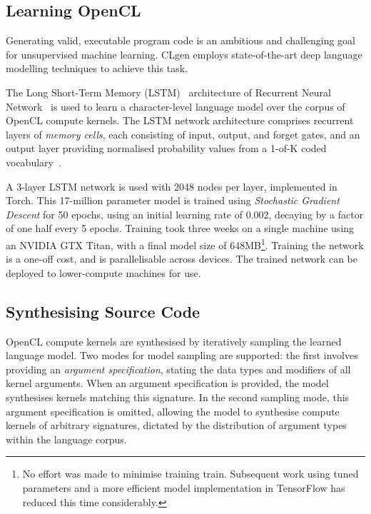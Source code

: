 \subsection{Learning OpenCL}
\label{sec:learning-opencl}

Generating valid, executable program code is an ambitious and challenging goal for unsupervised machine learning. CLgen employs state-of-the-art deep language modelling techniques to achieve this task.

The Long Short-Term Memory (LSTM)~\cite{Hochreiter1997} architecture of Recurrent Neural Network~\cite{Sundermeyer2012,Mikolov2015} is used to learn a character-level language model over the corpus of OpenCL compute kernels. The LSTM network architecture comprises recurrent layers of \emph{memory cells}, each consisting of input, output, and forget gates, and an output layer providing normalised probability values from a 1-of-K coded vocabulary~\cite{Graves2005}.

A 3-layer LSTM network is used with 2048 nodes per layer, implemented in Torch. This 17-million parameter model is trained using \textit{Stochastic Gradient Descent} for 50 epochs, using an initial learning rate of 0.002, decaying by a factor of one half every 5 epochs. Training took three weeks on a single machine using an NVIDIA GTX Titan, with a final model size of 648MB\footnote{No effort was made to minimise training train. Subsequent work using tuned parameters and a more efficient model implementation in TensorFlow has reduced this time considerably.}. Training the network is a one-off cost, and is parallelisable across devices. The trained network can be deployed to lower-compute machines for use.

\subsection{Synthesising Source Code}
\label{subsec:synthesizing-opencl}

OpenCL compute kernels are synthesised by iteratively sampling the learned language model. Two modes for model sampling are supported: the first involves providing an \emph{argument specification}, stating the data types and modifiers of all kernel arguments. When an argument specification is provided, the model synthesises kernels matching this signature. In the second sampling mode, this argument specification is omitted, allowing the model to synthesise compute kernels of arbitrary signatures, dictated by the distribution of argument types within the language corpus.

